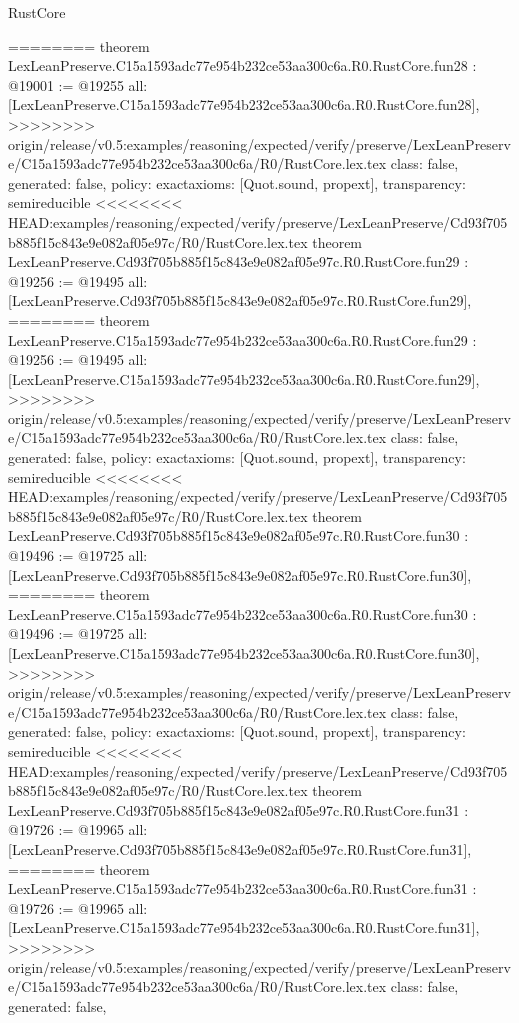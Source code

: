 \begin{lexlean}{RustCore}
\begin{coremodule}
{\begin{coremodule}
{{{{{{{{{{{{{{{{{{{{{{{{{{{{{{{========
theorem LexLeanPreserve.C15a1593adc77e954b232ce53aa300c6a.R0.RustCore.fun28 : @19001 := @19255 {
  all: [LexLeanPreserve.C15a1593adc77e954b232ce53aa300c6a.R0.RustCore.fun28],
>>>>>>>> origin/release/v0.5:examples/reasoning/expected/verify/preserve/LexLeanPreserve/C15a1593adc77e954b232ce53aa300c6a/R0/RustCore.lex.tex
  class: false,
  generated: false,
  policy: exact{axioms: [Quot.sound, propext]},
  transparency: semireducible
}
<<<<<<<< HEAD:examples/reasoning/expected/verify/preserve/LexLeanPreserve/Cd93f705b885f15c843e9e082af05e97c/R0/RustCore.lex.tex
theorem LexLeanPreserve.Cd93f705b885f15c843e9e082af05e97c.R0.RustCore.fun29 : @19256 := @19495 {
  all: [LexLeanPreserve.Cd93f705b885f15c843e9e082af05e97c.R0.RustCore.fun29],
========
theorem LexLeanPreserve.C15a1593adc77e954b232ce53aa300c6a.R0.RustCore.fun29 : @19256 := @19495 {
  all: [LexLeanPreserve.C15a1593adc77e954b232ce53aa300c6a.R0.RustCore.fun29],
>>>>>>>> origin/release/v0.5:examples/reasoning/expected/verify/preserve/LexLeanPreserve/C15a1593adc77e954b232ce53aa300c6a/R0/RustCore.lex.tex
  class: false,
  generated: false,
  policy: exact{axioms: [Quot.sound, propext]},
  transparency: semireducible
}
<<<<<<<< HEAD:examples/reasoning/expected/verify/preserve/LexLeanPreserve/Cd93f705b885f15c843e9e082af05e97c/R0/RustCore.lex.tex
theorem LexLeanPreserve.Cd93f705b885f15c843e9e082af05e97c.R0.RustCore.fun30 : @19496 := @19725 {
  all: [LexLeanPreserve.Cd93f705b885f15c843e9e082af05e97c.R0.RustCore.fun30],
========
theorem LexLeanPreserve.C15a1593adc77e954b232ce53aa300c6a.R0.RustCore.fun30 : @19496 := @19725 {
  all: [LexLeanPreserve.C15a1593adc77e954b232ce53aa300c6a.R0.RustCore.fun30],
>>>>>>>> origin/release/v0.5:examples/reasoning/expected/verify/preserve/LexLeanPreserve/C15a1593adc77e954b232ce53aa300c6a/R0/RustCore.lex.tex
  class: false,
  generated: false,
  policy: exact{axioms: [Quot.sound, propext]},
  transparency: semireducible
}
<<<<<<<< HEAD:examples/reasoning/expected/verify/preserve/LexLeanPreserve/Cd93f705b885f15c843e9e082af05e97c/R0/RustCore.lex.tex
theorem LexLeanPreserve.Cd93f705b885f15c843e9e082af05e97c.R0.RustCore.fun31 : @19726 := @19965 {
  all: [LexLeanPreserve.Cd93f705b885f15c843e9e082af05e97c.R0.RustCore.fun31],
========
theorem LexLeanPreserve.C15a1593adc77e954b232ce53aa300c6a.R0.RustCore.fun31 : @19726 := @19965 {
  all: [LexLeanPreserve.C15a1593adc77e954b232ce53aa300c6a.R0.RustCore.fun31],
>>>>>>>> origin/release/v0.5:examples/reasoning/expected/verify/preserve/LexLeanPreserve/C15a1593adc77e954b232ce53aa300c6a/R0/RustCore.lex.tex
  class: false,
  generated: false,
}}}}}}}}}}}}}}}}}}}}}}}}}}}}}}}}}}}
\end{coremodule}}
\end{coremodule}
\end{lexlean}
